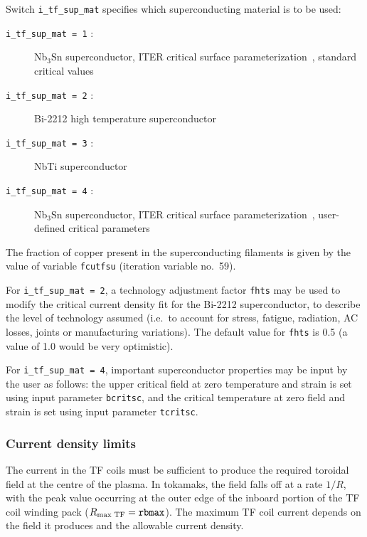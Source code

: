 \documentclass[11pt,a4paper]{report}
\begin{document}
Switch \texttt{i\_tf\_sup\_mat} specifies which superconducting material is to be
used:
\begin{description}
\item [\texttt{i\_tf\_sup\_mat = 1} :] Nb$_3$Sn superconductor, ITER critical surface
  parameterization~\cite{iter_nb3sn}, standard critical values
\item [\texttt{i\_tf\_sup\_mat = 2} :] Bi-2212 high temperature superconductor %
\item [\texttt{i\_tf\_sup\_mat = 3} :] NbTi superconductor
\item [\texttt{i\_tf\_sup\_mat = 4} :] Nb$_3$Sn superconductor, ITER critical surface
  parameterization~\cite{iter_nb3sn}, user-defined critical parameters
\end{description}
The fraction of copper present in the superconducting filaments is given by
the value of variable \texttt{fcutfsu} (iteration variable no.\ 59).

For \texttt{i\_tf\_sup\_mat = 2}, a technology adjustment factor \texttt{fhts} may be
used to modify the critical current density fit for the Bi-2212
superconductor, to describe the level of technology assumed (i.e.\ to account
for stress, fatigue, radiation, AC losses, joints or manufacturing variations).
The default value for \texttt{fhts} is 0.5 (a value of 1.0 would be very
optimistic).

For \texttt{i\_tf\_sup\_mat = 4}, important superconductor properties may be input by
the user as follows: the upper critical field at zero temperature and strain
is set using input parameter \texttt{bcritsc}, and the critical temperature at
zero field and strain is set using input parameter \texttt{tcritsc}.

\subsubsection{Current density limits}

The current in the TF coils must be sufficient to produce the required
toroidal field at the centre of the plasma. In tokamaks, the field falls off
at a rate $1/R$, with the peak value occurring at the outer edge of the
inboard portion of the TF coil winding pack ($R_{\mbox{\scriptsize max TF}} =
\mathtt{rbmax}$). The maximum TF coil current depends on the field it produces
and the allowable current density.

\newcommand{\jop}{$J_{\mbox{\scriptsize op}}$ }
\newcommand{\jcrit}{$J_{\mbox{\scriptsize crit}}$}
\end{document}
